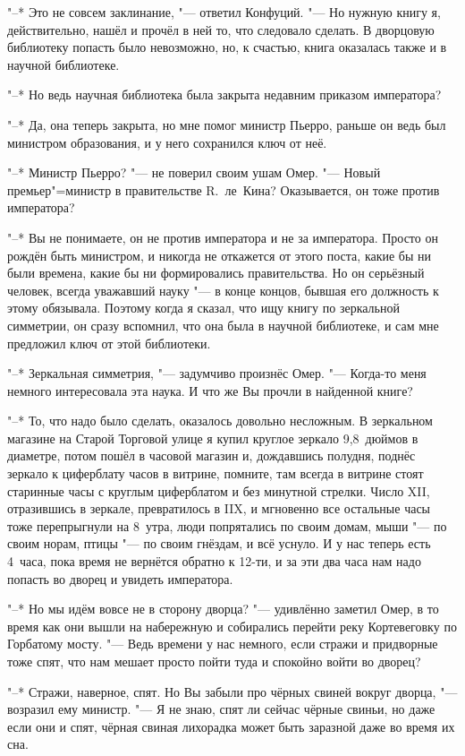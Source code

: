 "--* Это не совсем заклинание, "--- ответил Конфуций.
"--- Но нужную книгу я, действительно, нашёл и прочёл в ней то, что следовало
сделать.
В дворцовую библиотеку попасть было невозможно, но, к счастью, книга оказалась
также и в научной библиотеке.

"--* Но ведь научная библиотека была закрыта недавним приказом императора?

"--* Да, она теперь закрыта, но мне помог министр Пьерро, раньше он ведь был
министром образования, и у него сохранился ключ от неё.

"--* Министр Пьерро? "--- не поверил своим ушам Омер.
"--- Новый премьер"=министр в правительстве R.~ле~Кина?
Оказывается, он тоже против императора?

"--* Вы не понимаете, он не против императора и не за императора.
Просто он рождён быть министром, и никогда не откажется от этого поста, какие бы
ни были времена, какие бы ни формировались правительства.
Но он серьёзный человек, всегда уважавший науку "--- в конце концов, бывшая его
должность к этому обязывала.
Поэтому когда я сказал, что ищу книгу по зеркальной симметрии, он сразу
вспомнил, что она была в научной библиотеке, и сам мне предложил ключ от этой
библиотеки.

"--* Зеркальная симметрия, "--- задумчиво произнёс Омер.
"--- Когда-то меня немного интересовала эта наука.
И что же Вы прочли в найденной книге?

"--* То, что надо было сделать, оказалось довольно несложным.
В зеркальном магазине на Старой Торговой улице я купил круглое зеркало 9,8~дюймов
в диаметре, потом пошёл в часовой магазин и, дождавшись полудня, поднёс
зеркало к циферблату часов в витрине, помните, там всегда в витрине стоят
старинные часы с круглым циферблатом и без минутной стрелки.
Число XII, отразившись в зеркале, превратилось в IIX, и мгновенно все остальные
часы тоже перепрыгнули на 8~утра, люди попрятались по своим домам, мыши "--- по
своим норам, птицы "--- по своим гнёздам, и всё уснуло.
И у нас теперь есть 4~часа, пока время не вернётся обратно к 12-ти, и за эти два
часа нам надо попасть во дворец и увидеть императора.

"--* Но мы идём вовсе не в сторону дворца? "--- удивлённо заметил Омер, в то
время как они вышли на набережную и собирались перейти реку Кортевеговку по
Горбатому мосту.
"--- Ведь времени у нас немного, если стражи и придворные тоже спят, что нам
мешает просто пойти туда и спокойно войти во дворец?

"--* Стражи, наверное, спят.
Но Вы забыли про чёрных свиней вокруг дворца, "--- возразил ему министр.
"--- Я не знаю, спят ли сейчас чёрные свиньи, но даже если они и спят, чёрная
свиная лихорадка может быть заразной даже во время их сна.

